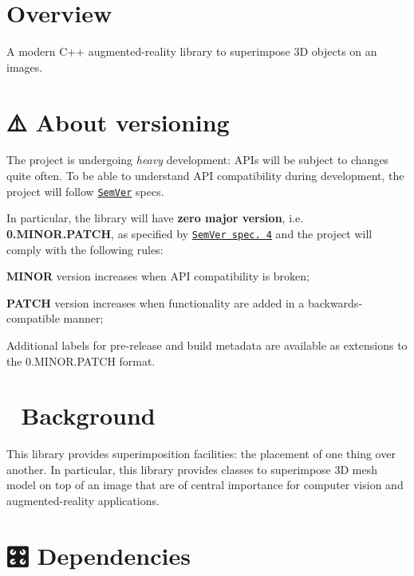 \hypertarget{index_overview}{}\section{Overview}\label{index_overview}
A modern C++ augmented-\/reality library to superimpose 3D objects on an images.\hypertarget{index_versioning}{}\section{⚠️ About versioning}\label{index_versioning}


 The project is undergoing {\itshape heavy} development\+: A\+P\+Is will be subject to changes quite often. To be able to understand A\+PI compatibility during development, the project will follow \href{http://semver.org/}{\tt Sem\+Ver} specs.

In particular, the library will have {\bfseries zero major version}, i.\+e. {\bfseries 0.\+M\+I\+N\+O\+R.\+P\+A\+T\+CH}, as specified by \href{http://semver.org/#spec-item-4}{\tt Sem\+Ver spec. 4} and the project will comply with the following rules\+:
\begin{DoxyEnumerate}
\item {\bfseries M\+I\+N\+OR} version increases when A\+PI compatibility is broken;
\item {\bfseries P\+A\+T\+CH} version increases when functionality are added in a backwards-\/compatible manner;
\item Additional labels for pre-\/release and build metadata are available as extensions to the 0.\+M\+I\+N\+O\+R.\+P\+A\+T\+CH format.
\end{DoxyEnumerate}\hypertarget{index_background}{}\section{📖 Background}\label{index_background}


 This library provides superimposition facilities\+: the placement of one thing over another. In particular, this library provides classes to superimpose 3D mesh model on top of an image that are of central importance for computer vision and augmented-\/reality applications.\hypertarget{index_dependencies}{}\section{🎛 Dependencies}\label{index_dependencies}


